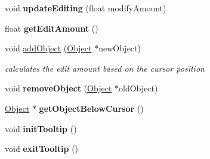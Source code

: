 \begin{DoxyCompactItemize}
\item 
\hypertarget{classObjectManager_a2839b93ae3703d493f994901d336926b}{
void {\bfseries update\-Editing} (float modify\-Amount)}
\label{d6/d6f/classObjectManager_a2839b93ae3703d493f994901d336926b}

\item 
\hypertarget{classObjectManager_ad6404a2903ff680ff242e0dcbc426c5d}{
float {\bfseries get\-Edit\-Amount} ()}
\label{d6/d6f/classObjectManager_ad6404a2903ff680ff242e0dcbc426c5d}

\item 
\hypertarget{classObjectManager_a60577e37e4f2d7f1550680e62825eda8}{
void \hyperlink{classObjectManager_a60577e37e4f2d7f1550680e62825eda8}{add\-Object} (\hyperlink{classObject}{\-Object} $\ast$new\-Object)}
\label{d6/d6f/classObjectManager_a60577e37e4f2d7f1550680e62825eda8}

\begin{DoxyCompactList}\small\item\em calculates the edit amount based on the cursor position \end{DoxyCompactList}\item 
\hypertarget{classObjectManager_a1ba2909e0184849f2b68ce225b398850}{
void {\bfseries remove\-Object} (\hyperlink{classObject}{\-Object} $\ast$old\-Object)}
\label{d6/d6f/classObjectManager_a1ba2909e0184849f2b68ce225b398850}

\item 
\hypertarget{classObjectManager_aedd984e24f54985c01dc6a0ed4b745c4}{
\hyperlink{classObject}{\-Object} $\ast$ {\bfseries get\-Object\-Below\-Cursor} ()}
\label{d6/d6f/classObjectManager_aedd984e24f54985c01dc6a0ed4b745c4}

\item 
\hypertarget{classObjectManager_add415a33c5c165da53d832c9d7b1c85f}{
void {\bfseries init\-Tooltip} ()}
\label{d6/d6f/classObjectManager_add415a33c5c165da53d832c9d7b1c85f}

\item 
\hypertarget{classObjectManager_ac94351e3ac91ef7f3485488cc851feea}{
void {\bfseries exit\-Tooltip} ()}
\label{d6/d6f/classObjectManager_ac94351e3ac91ef7f3485488cc851feea}

\end{DoxyCompactItemize}
